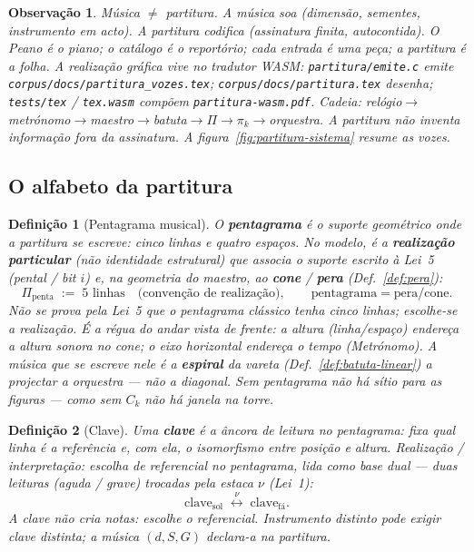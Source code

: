 \documentclass[11pt,a4paper]{article}
\newtheorem{definicao}{Definição}
\newtheorem{observacao}{Observação}
\newcommand{\code}[1]{\texttt{#1}}
\begin{document}
\begin{observacao}
Música $\neq$ partitura. A música \emph{soa} (dimensão, sementes,
instrumento em acto). A partitura \emph{codifica} (assinatura finita,
autocontida). O Peano é o piano; o catálogo é o reportório; cada entrada
é uma peça; a partitura é a folha.
A realização gráfica vive no tradutor WASM:
\code{partitura/emite.c} emite \code{corpus/docs/partitura\_vozes.tex};
\code{corpus/docs/partitura.tex} desenha; \code{tests/tex} / \code{tex.wasm}
compõem \code{partitura-wasm.pdf}. Cadeia:
relógio$\to$metrónomo$\to$maestro$\to$batuta$\to\Pi\to\pi_k\to$orquestra.
A partitura não inventa informação fora da assinatura.
A figura~\ref{fig:partitura-sistema} resume as vozes.
\end{observacao}

\subsection*{O alfabeto da partitura}

\begin{definicao}[Pentagrama musical]\label{def:pentagrama}
O \textbf{pentagrama} é o suporte geométrico onde a partitura se escreve:
cinco linhas e quatro espaços. No modelo, é a
\textbf{realização particular} (não identidade estrutural) que associa
o suporte escrito à Lei~5 (pental / bit $i$) e, na geometria do maestro,
ao \textbf{cone} / \textbf{pera} (Def.~\ref{def:pera}):
\[
\Pi_{\mathrm{penta}}\;:=\;5\text{ linhas}
\quad\text{(convenção de realização)},
\qquad
\boxed{\text{pentagrama}=\text{pera}/\text{cone}}.
\]
Não se prova pela Lei~5 que o pentagrama clássico tenha cinco linhas;
escolhe-se a realização.
É a régua do andar vista de frente: a altura (linha/espaço) endereça a
altura sonora no cone; o eixo horizontal endereça o tempo (Metrónomo).
A música que se escreve nele é a \textbf{espiral} da vareta
(Def.~\ref{def:batuta-linear}) a projectar a orquestra --- não a
diagonal. Sem pentagrama não há sítio para as figuras --- como sem
$C_k$ não há janela na torre.
\end{definicao}

\begin{definicao}[Clave]\label{def:clave}
Uma \textbf{clave} é a âncora de leitura no pentagrama: fixa qual linha
é a referência e, com ela, o isomorfismo entre posição e altura.
\emph{Realização / interpretação:} escolha de referencial no
pentagrama, lida como base dual --- duas leituras (aguda / grave)
trocadas pela estaca $\nu$ (Lei~1):
\[
\mathrm{clave}_{\mathrm{sol}}
\;\overset{\nu}{\longleftrightarrow}\;
\mathrm{clave}_{\mathrm{fá}}.
\]
A clave não cria notas: escolhe o referencial. Instrumento distinto
pode exigir clave distinta; a música $(d,S,G)$ declara-a na partitura.
\end{definicao}
\end{document}
